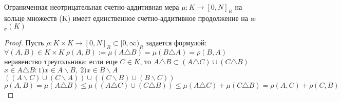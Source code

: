 \begin{theorem}[Лекция 5] Ограниченная неотрицательная счетно-аддитивная мера $\mu : K \rightarrow [0, N]_R$ на кольце множеств (K) имеет единственное счетно-аддитивное продолжение на \ae$_{\sigma}(K)$\\
	\end{theorem}
\begin{proof}
Пусть $\rho: K\times K \rightarrow [0,N]_R \subset [0,\infty)_R$ задается формулой:\\ $\forall (A,B) \in K\times K \  \rho(A,B):=\mu(A\triangle B) = \mu(B\triangle A) = \rho (B,A)$\\
неравенство треугольника: если еще $C \in K$, то $A\triangle B \subset (A \triangle C) \cup (C\triangle B)$\\
$x\in A\triangle B: 1) x\in A\backslash B,\  2) x\in B\backslash A$\\
$((A\backslash C)\cup (C\backslash A)) \cup ((C\backslash B)\cup (B\backslash C))$\\
$\rho(A,B) = \mu(A\triangle B) \leq \mu((A\triangle C)\cup (C\triangle B))\leq \mu(A\triangle C) + \mu(C\triangle B) = \rho(A,C) + \rho(C,B)$\\
\end{proof}


